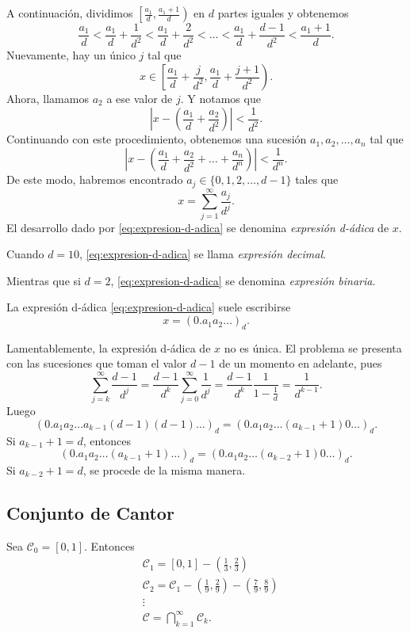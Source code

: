  A continuaci\'on,  dividimos $\left[\frac{a_1}{d}, \frac{a_1+1}{d} \right)$ en $d$ partes iguales y obtenemos
 \[
 \frac{a_1}{d}<\frac{a_1}{d}+\frac{1}{d^2}<\frac{a_1}{d}+\frac{2}{d^2}
 < \ldots<\frac{a_1}{d}+\frac{d-1}{d^2}<\frac{a_1+1}{d}.
 \]
 Nuevamente, hay un \'unico $j$ tal que 
 \[x \in \left[\frac{a_1}{d}+\frac{j}{d^2}, \frac{a_1}{d}+\frac{j+1}{d^2}\right).
 \]
 Ahora, llamamos $a_2$  a ese valor de $j$. Y notamos que 
 \[
 \left|x-\left(\frac{a_1}{d}+\frac{a_2}{d^2}\right)\right|<\frac{1}{d^2}.
 \]
 Continuando con este procedimiento, obtenemos una sucesi\'on $a_1,a_2,\ldots,a_n$ tal que 
 \[
 \left|  
 x-\left( \frac{a_1}{d}+\frac{a_2}{d^2}+\ldots+\frac{a_n}{d^n}\right)
 \right|<\frac{1}{d^n}.
 \]
 De este modo, habremos encontrado $a_j \in \{ 0,1,2,\ldots,d-1\}$ tales que 
 \begin{equation}\label{eq:expresion-d-adica}
 x=\sum\limits_{j=1}^{\infty} \frac{a_j}{d^j}.
 \end{equation}
 El desarrollo dado por  \eqref{eq:expresion-d-adica} se denomina \emph{expresi\'on  d-\'adica} de $x$. 
 
 Cuando $d=10$, \eqref{eq:expresion-d-adica} se llama \emph{expresi\'on decimal}.
 
Mientras que si $d=2$, \eqref{eq:expresion-d-adica} se denomina \emph{expresi\'on binaria}.
 
La expresi\'on d-\'adica \eqref{eq:expresion-d-adica} suele escribirse
\[
x=\left(0.a_1a_2\ldots\right)_d.
\]

Lamentablemente, la expresi\'on d-\'adica de $x$ no es \'unica. El problema se presenta con las sucesiones que toman el valor $d-1$ de un momento en adelante, pues
\[
\sum\limits_{j=k}^{\infty} \frac{d-1}{d^j}=
\frac{d-1}{d^k} \sum\limits_{j=0}^{\infty} \frac{1}{d^j}=
\frac{d-1}{d^k} \frac{1}{1-\frac{1}{d}}=\frac{1}{d^{k-1}}.
\]
Luego
\[
\left(0.a_1a_2\ldots a_{k-1} (d-1) (d-1)\dots\right)_d =
\left(0.a_1a_2\ldots (a_{k-1} +1) 0\dots\right)_d.
\]
 Si $a_{k-1}+1=d$, entonces 
 \[
 \left(0.a_1a_2\ldots (a_{k-1} +1)\dots\right)_d=
 \left(0.a_1a_2\ldots (a_{k-2} +1) 0\dots\right)_d.
\]
Si $a_{k-2}+1=d$, se procede de la misma manera. 


 \subsection{Conjunto de Cantor}
 Sea $\mathscr{C}_0=[0,1]$. 
 Entonces
 \[
 \begin{split}
 &\mathscr{C}_1=[0,1]-\left(\frac{1}{3},\frac{2}{3}\right)
 \\
  &\mathscr{C}_2=\mathscr{C}_1-\left(\frac{1}{9},\frac{2}{9}\right)
   -\left(\frac{7}{9},\frac{8}{9}\right)
   \\
   &\vdots
   \\
   &\mathscr{C}=\bigcap\limits_{k=1}^{\infty} \mathscr{C}_k.
 \end{split}
 \]
 
